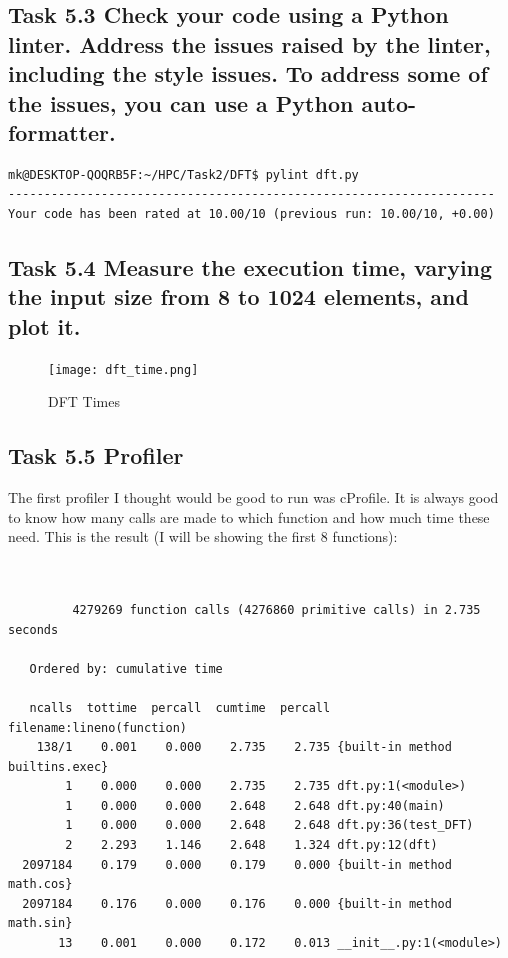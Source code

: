 \documentclass{article}
\begin{document}
\subsection{Task 5.3 Check your code using a Python linter. Address the issues raised by the linter, including the style issues. To address some of the issues, you can use a Python auto-formatter.}



\begin{minipage}{\linewidth}
\begin{lstlisting}
mk@DESKTOP-QOQRB5F:~/HPC/Task2/DFT$ pylint dft.py
--------------------------------------------------------------------
Your code has been rated at 10.00/10 (previous run: 10.00/10, +0.00)
\end{lstlisting}
\end{minipage}

\subsection{Task 5.4 Measure the execution time, varying the input size from 8 to 1024 elements, and plot it.}

\begin{figure}[h]
\centering
\begin{minipage}[c]{\textwidth}
\texttt{[image: dft\_time.png]}
\caption{DFT Times}
\end{minipage}
\end{figure}


\subsection{Task 5.5 Profiler}

The first profiler I thought would be good to run was cProfile. It is always good to know how many calls are made to which function and how much time these need.
This is the result (I will be showing the first 8 functions):
\begin{minipage}{\linewidth}
\begin{verbatim}
    

         4279269 function calls (4276860 primitive calls) in 2.735 seconds

   Ordered by: cumulative time

   ncalls  tottime  percall  cumtime  percall filename:lineno(function)
    138/1    0.001    0.000    2.735    2.735 {built-in method builtins.exec}
        1    0.000    0.000    2.735    2.735 dft.py:1(<module>)
        1    0.000    0.000    2.648    2.648 dft.py:40(main)
        1    0.000    0.000    2.648    2.648 dft.py:36(test_DFT)
        2    2.293    1.146    2.648    1.324 dft.py:12(dft)
  2097184    0.179    0.000    0.179    0.000 {built-in method math.cos}
  2097184    0.176    0.000    0.176    0.000 {built-in method math.sin}
       13    0.001    0.000    0.172    0.013 __init__.py:1(<module>)
\end{verbatim}
\end{minipage}
\end{document}

